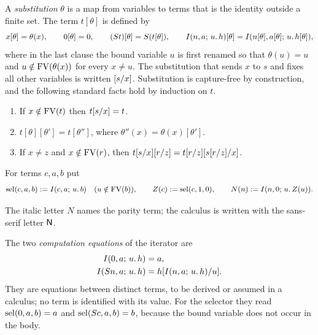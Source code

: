 A \emph{substitution} $\theta$ is a map from variables to terms that is the
identity outside a finite set.  The term $t[\theta]$ is defined by
\[
 x[\theta]=\theta(x),\qquad 0[\theta]=0,\qquad
 (S t)[\theta]=S(t[\theta]),\qquad
 I(n,a;\,u.\,h)[\theta]=I(n[\theta],a[\theta];\,u.\,h[\theta]),
\]
where in the last clause the bound variable $u$ is first renamed so that
$\theta(u)=u$ and $u\notin\operatorname{FV}(\theta(x))$ for every $x\neq u$.  The
substitution that sends $x$ to $s$ and fixes all other variables is written
$[s/x]$.  Substitution is capture-free by construction, and the
following standard facts hold by induction on $t$.

\begin{lemma}[Substitution]
\label{base:lem:subst}
\begin{enumerate}[label=\textup{(\roman*)}]
\item If $x\notin\operatorname{FV}(t)$ then $t[s/x]=t$.
\item $t[\theta][\theta']=t[\theta'']$, where $\theta''(x)=\theta(x)[\theta']$.
\item If $x\neq z$ and $x\notin\operatorname{FV}(r)$, then
 $t[s/x][r/z]=t[r/z][s[r/z]/x]$.
\end{enumerate}
\end{lemma}

\begin{definition}
\label{base:def:sel}
For terms $c,a,b$ put
\[
 \operatorname{sel}(c,a,b)\mathrel{:=}I(c,a;\,u.\,b)\quad(u\notin\operatorname{FV}(b)),\qquad
 Z(c)\mathrel{:=}\operatorname{sel}(c,1,0),\qquad
 N(n)\mathrel{:=}I(n,0;\,u.\,Z(u)) .
\]
\end{definition}

The italic letter $N$ names the parity term; the calculus is written with
the sans-serif letter $\mathsf{N}$.

The two \emph{computation equations} of the iterator are
\begin{align}
 I(0,a;\,u.\,h)&=a, \label{base:eq:I0}\\
 I(S n,a;\,u.\,h)&=h[I(n,a;\,u.\,h)/u]. \label{base:eq:IS}
\end{align}
They are equations between distinct terms, to be derived or assumed in a
calculus; no term is identified with its value.  For the selector they read
$\operatorname{sel}(0,a,b)=a$ and $\operatorname{sel}(S c,a,b)=b$, because the bound variable does not
occur in the body.

